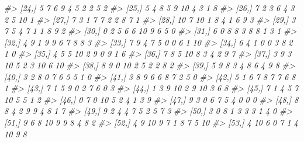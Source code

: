 \documentclass[
]{book}
\newenvironment{Shaded}{\begin{snugshade}}{\end{snugshade}}
\newcommand{\CommentTok}[1]{\textcolor[rgb]{0.56,0.35,0.01}{\textit{#1}}}
\begin{document}
\begin{Shaded}
\begin{Highlighting}[]
\CommentTok{\#\textgreater{}  [24,]    5    7    6    9    4    5    2    2    5     2}
\CommentTok{\#\textgreater{}  [25,]    5    4    8    5    9   10    4    3    1     8}
\CommentTok{\#\textgreater{}  [26,]    7    2    3    6    4    3    2    5   10     1}
\CommentTok{\#\textgreater{}  [27,]    7    3    1    7    7    2    2    8    7     1}
\CommentTok{\#\textgreater{}  [28,]   10    7   10    1    8    4    1    6    9     3}
\CommentTok{\#\textgreater{}  [29,]    3    7    5    4    7    1    1    8    9     2}
\CommentTok{\#\textgreater{}  [30,]    0    2    5    6    6   10    9    6    5     0}
\CommentTok{\#\textgreater{}  [31,]    6    0    8    8    3    8    8    1    3     1}
\CommentTok{\#\textgreater{}  [32,]    4    9    1    9    9    6    7    8    8     3}
\CommentTok{\#\textgreater{}  [33,]    7    9    4    7    5    0    0    6    1    10}
\CommentTok{\#\textgreater{}  [34,]    6    4    1    0    0    3    8    2    1     0}
\CommentTok{\#\textgreater{}  [35,]    4    5    5   10    2    9    0    9    1     6}
\CommentTok{\#\textgreater{}  [36,]    7    8    5   10    8    3    4    2    9     7}
\CommentTok{\#\textgreater{}  [37,]    3    9    3   10    5    2    3   10    6    10}
\CommentTok{\#\textgreater{}  [38,]    8    9    0   10    2    5    2    2    8     2}
\CommentTok{\#\textgreater{}  [39,]    5    9    8    3    4    8    6    4    9     8}
\CommentTok{\#\textgreater{}  [40,]    3    2    8    0    7    6    5    5    1     0}
\CommentTok{\#\textgreater{}  [41,]    3    8    9    6    6    8    7    2    5     0}
\CommentTok{\#\textgreater{}  [42,]    5    1    6    7    8    7    7    6    8     1}
\CommentTok{\#\textgreater{}  [43,]    7    1    5    9    0    2    7    6    0     3}
\CommentTok{\#\textgreater{}  [44,]    1    3    9   10    2    9   10    3    6     8}
\CommentTok{\#\textgreater{}  [45,]    7    1    4    5    7   10    5    5    1     2}
\CommentTok{\#\textgreater{}  [46,]    0    7    0   10    5    2    4    1    3     9}
\CommentTok{\#\textgreater{}  [47,]    9    3    0    6    7    5    4    0    0     0}
\CommentTok{\#\textgreater{}  [48,]    8    8    4    2    9    9    4    8    1     7}
\CommentTok{\#\textgreater{}  [49,]    9    2    4    4    7    5    2    5    7     3}
\CommentTok{\#\textgreater{}  [50,]    3    0    8    1    3    3    3    1    4     0}
\CommentTok{\#\textgreater{}  [51,]    9    6    8   10    9    9    8    4    8     2}
\CommentTok{\#\textgreater{}  [52,]    4    9   10    9    7    1    8    7    5    10}
\CommentTok{\#\textgreater{}  [53,]    4   10    6    0    7    1    4   10    9     8}

\end{Highlighting}
\end{Shaded}
\end{document}
